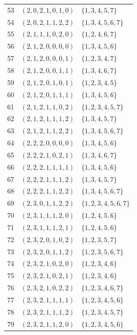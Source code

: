 \documentclass[11pt,a4paper]{article}
\theoremstyle{remark}\newtheorem{remark}[theorem]{Remark}
\begin{document}
{\begin{longtable}{r@{\qquad}c@{\qquad}l}
53 & $(2,0,2,1,0,1,0)$ & $\{1,3,4,5,7\}$ \\
54 & $(2,0,2,1,1,2,2)$ & $\{1,3,4,5,6,7\}$ \\
55 & $(2,1,1,1,0,2,0)$ & $\{1,2,4,6,7\}$ \\
56 & $(2,1,2,0,0,0,0)$ & $\{1,3,4,5,6\}$ \\
57 & $(2,1,2,0,0,0,1)$ & $\{1,2,3,4,7\}$ \\
58 & $(2,1,2,0,0,1,1)$ & $\{1,3,4,6,7\}$ \\
59 & $(2,1,2,0,1,0,1)$ & $\{1,2,3,4,5\}$ \\
60 & $(2,1,2,0,1,1,1)$ & $\{1,3,4,5,6\}$ \\
61 & $(2,1,2,1,1,0,2)$ & $\{1,2,3,4,5,7\}$ \\
62 & $(2,1,2,1,1,1,2)$ & $\{1,3,4,5,7\}$ \\
63 & $(2,1,2,1,1,2,2)$ & $\{1,3,4,5,6,7\}$ \\
64 & $(2,2,2,0,0,0,0)$ & $\{1,3,4,5,6\}$ \\
65 & $(2,2,2,1,0,2,1)$ & $\{1,3,4,6,7\}$ \\
66 & $(2,2,2,1,1,1,1)$ & $\{1,3,4,5,6\}$ \\
67 & $(2,2,2,1,1,1,2)$ & $\{1,3,4,5,7\}$ \\
68 & $(2,2,2,1,1,2,2)$ & $\{1,3,4,5,6,7\}$ \\
69 & $(2,3,0,1,1,2,2)$ & $\{1,2,3,4,5,6,7\}$ \\
70 & $(2,3,1,1,1,2,0)$ & $\{1,2,4,5,6\}$ \\
71 & $(2,3,1,1,1,2,1)$ & $\{1,2,4,5,6\}$ \\
72 & $(2,3,2,0,1,0,2)$ & $\{1,2,3,5,7\}$ \\
73 & $(2,3,2,0,1,1,2)$ & $\{1,2,3,5,6,7\}$ \\
74 & $(2,3,2,1,0,2,0)$ & $\{1,2,3,4,6\}$ \\
75 & $(2,3,2,1,0,2,1)$ & $\{1,2,3,4,6\}$ \\
76 & $(2,3,2,1,0,2,2)$ & $\{1,2,3,4,6,7\}$ \\
77 & $(2,3,2,1,1,1,1)$ & $\{1,2,3,4,5,6\}$ \\
78 & $(2,3,2,1,1,1,2)$ & $\{1,2,3,4,5,7\}$ \\
79 & $(2,3,2,1,1,2,0)$ & $\{1,2,3,4,5,6\}$ \\
\end{longtable}
}
\end{document}
